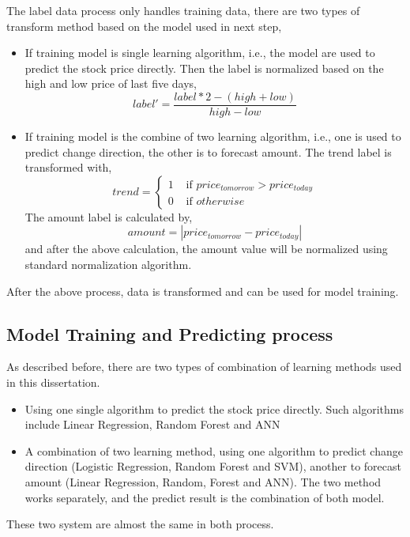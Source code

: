 The label data process only handles training data, there are two types of transform method based on the model used in next step,
\begin{itemize}
	\item If training model is single learning algorithm, i.e., the model are used to predict the stock price directly. Then the label is normalized based on the high and low price of last five days,
	\begin{equation}
	label'=\frac{label*2-(high + low)}{high - low}
	\end{equation}
	\item If training model is the combine of two learning algorithm, i.e., one is used to predict change direction, the other is to forecast amount. The trend label is transformed with,
	\begin{equation}
	trend=\begin{cases}
	1 & \text{ if } price_{tomorrow} > price_{today} \\ 
	0 & \text{ if } otherwise
	\end{cases}
	\end{equation}
	The amount label is calculated by,
	\begin{equation}
	amount=\left | price_{tomorrow} - price_{today} \right |
	\end{equation}
	and after the above calculation, the amount value will be normalized using standard normalization algorithm. 
\end{itemize}

After the above process, data is transformed and can be used for model training.

\subsection{Model Training and Predicting process}
As described before, there are two types of combination of learning methods used in this dissertation. 
\begin{itemize}
	\item Using one single algorithm to predict the stock price directly. Such algorithms include Linear Regression, Random Forest and ANN
	\item A combination of two learning method, using one algorithm to predict change direction (Logistic Regression, Random Forest and SVM), another to forecast amount (Linear Regression, Random, Forest and ANN). The two method works separately, and the predict result is the combination of both model.
\end{itemize}

These two system are almost the same in both process.